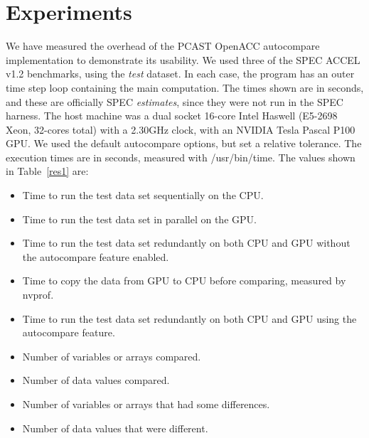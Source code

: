 \section{Experiments}

We have measured the overhead of the PCAST OpenACC autocompare implementation to demonstrate its usability.
We used three of the SPEC ACCEL v1.2 benchmarks, using the \emph{test} dataset.
In each case, the program has an outer time step loop containing the main computation.
The times shown are in seconds, and these are officially SPEC \emph{estimates}, since they were not run in the SPEC harness.
The host machine was a dual socket 16-core Intel Haswell (E5-2698 Xeon, 32-cores total) with a 2.30GHz clock, with an NVIDIA Tesla Pascal P100 GPU.
We used the default autocompare options, but set a relative tolerance.
The execution times are in seconds, measured with /usr/bin/time.
The values shown in Table~\ref{res1} are:
\begin{itemize}
\item Time to run the test data set sequentially on the CPU.
\item Time to run the test data set in parallel on the GPU.
\item Time to run the test data set redundantly on both CPU and GPU without the autocompare feature enabled.
\item Time to copy the data from GPU to CPU before comparing, measured by nvprof.
\item Time to run the test data set redundantly on both CPU and GPU using the autocompare feature.
\item Number of variables or arrays compared.
\item Number of data values compared.
\item Number of variables or arrays that had some differences.
\item Number of data values that were different.
\end{itemize}

